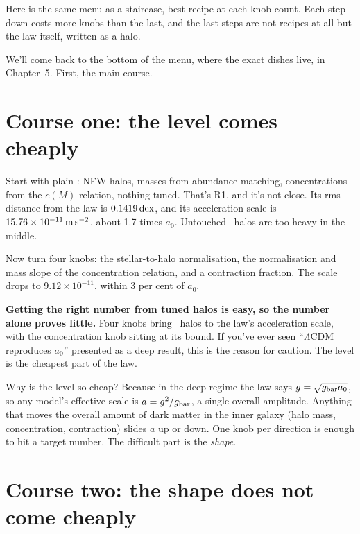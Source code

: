 Here is the same menu as a staircase, best recipe at each knob count. Each step down costs more knobs than the last, and the last steps are not recipes at all but the law itself, written as a halo.





We'll come back to the bottom of the menu, where the exact dishes live, in Chapter~5. First, the main course.

\section{Course one: the level comes cheaply}

Start with plain \LCDM: NFW halos, masses from abundance matching, concentrations from the $c(M)$ relation, nothing tuned. That's R1, and it's not close. Its rms distance from the law is $0.1419\,\mathrm{dex}$, and its acceleration scale is $15.76\times10^{-11}\,\mathrm{m\,s^{-2}}$, about 1.7 times $a_0$. Untouched \LCDM\ halos are too heavy in the middle.

Now turn four knobs: the stellar-to-halo normalisation, the normalisation and mass slope of the concentration relation, and a contraction fraction. The scale drops to $9.12\times10^{-11}$, within 3 per cent of $a_0$.

\begin{honestbox}
\textbf{Getting the right number from tuned halos is easy, so the number alone proves little.} Four knobs bring \LCDM\ halos to the law's acceleration scale, with the concentration knob sitting at its bound. If you've ever seen ``$\Lambda$CDM reproduces $a_0$'' presented as a deep result, this is the reason for caution. The level is the cheapest part of the law.
\end{honestbox}

Why is the level so cheap? Because in the deep regime the law says $g=\sqrt{g_{\rm bar} a_0}$, so any model's effective scale is $a=g^2/g_{\rm bar}$, a single overall amplitude. Anything that moves the overall amount of dark matter in the inner galaxy (halo mass, concentration, contraction) slides $a$ up or down. One knob per direction is enough to hit a target number. The difficult part is the \emph{shape}.

\section{Course two: the shape does not come cheaply}

